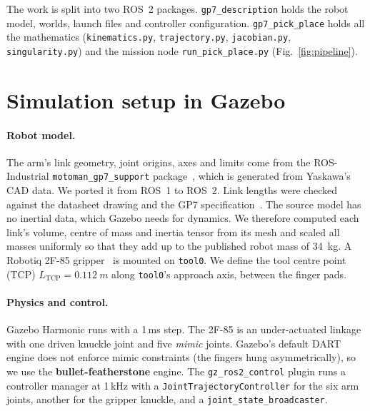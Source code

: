 \documentclass[11pt,a4paper]{article}
\begin{document}
The work is split into two ROS~2 packages. \texttt{gp7\_description} holds the robot
model, worlds, launch files and controller configuration. \texttt{gp7\_pick\_place}
holds all the mathematics (\texttt{kinematics.py}, \texttt{trajectory.py},
\texttt{jacobian.py}, \texttt{singularity.py}) and the mission node
\texttt{run\_pick\_place.py} (Fig.~\ref{fig:pipeline}).

\section{Simulation setup in Gazebo}

\paragraph{Robot model.}
The arm's link geometry, joint origins, axes and limits come from the ROS-Industrial
\texttt{motoman\_gp7\_support} package~\cite{rosi}, which is generated from Yaskawa's
CAD data. We ported it from ROS~1 to ROS~2. Link lengths were checked against
the datasheet drawing and the GP7 specification~\cite{gp7spec}. The source model has no
inertial data, which Gazebo needs for dynamics. We therefore computed each link's
volume, centre of mass and inertia tensor from its mesh and scaled all masses uniformly
so that they add up to the published robot mass of \SI{34}{kg}. A Robotiq 2F-85
gripper~\cite{robotiq} is mounted on \texttt{tool0}. We define the tool centre point
(TCP) \(L_\text{TCP}=\SI{0.112}{m}\) along \texttt{tool0}'s approach axis, between the
finger pads.

\paragraph{Physics and control.}
Gazebo Harmonic runs with a 1\,ms step. The 2F-85 is an under-actuated linkage with one
driven knuckle joint and five \emph{mimic} joints. Gazebo's default DART engine does not
enforce mimic constraints (the fingers hung asymmetrically), so we use the
\textbf{bullet-featherstone} engine. The \texttt{gz\_ros2\_control} plugin
runs a controller manager at 1\,kHz with a \texttt{JointTrajectoryController} for the six
arm joints, another for the gripper knuckle, and a \texttt{joint\_state\_broadcaster}.
\end{document}
